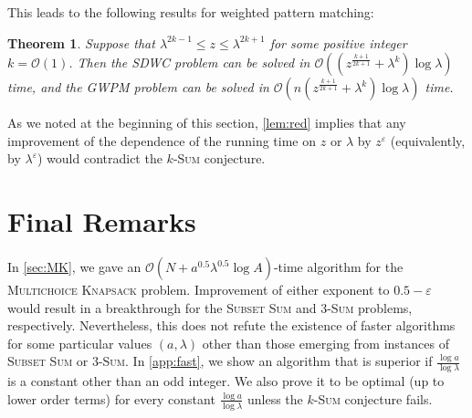 \documentclass{article}
\theoremstyle{plain}
\newtheorem{theorem}{Theorem}[section]
\theoremstyle{definition}
\newcommand{\MK}{\textsc{Multichoice Knapsack}\xspace}
\newcommand{\GWPM}{\textsc{GWPM}\xspace}
\newcommand{\SDWC}{\textsc{SDWC}\xspace}
\newcommand{\SubsetSum}{\textsc{Subset Sum}\xspace}
\newcommand{\Sum}{\textsc{Sum}\xspace}
\newcommand{\Oh}{\mathcal{O}}
\begin{document}
    This leads to the following results for weighted pattern matching:
    
   \begin{theorem}\label{thm:fast}
	Suppose that $\lambda^{2k-1}\le z \le \lambda^{2k+1}$ for some positive integer $k=\Oh(1)$.
	Then the \SDWC problem can be solved in $\Oh((z^{\frac{k+1}{2k+1}} + \lambda^{k})\log\lambda)$ time,
	and the \GWPM problem can be solved in $\Oh(n(z^{\frac{k+1}{2k+1}} + \lambda^{k})\log\lambda)$ time.
	\end{theorem}	
    
    As we noted at the beginning of this section, \cref{lem:red} implies that
    any improvement of the dependence of the running time on $z$ or $\lambda$ by $z^{\varepsilon}$ (equivalently, by $\lambda^{\varepsilon}$)
    would contradict the $k$-\Sum conjecture.
	

  \section{Final Remarks}\label{sec:fr}
  In \cref{sec:MK}, we gave an $\Oh(N+a^{0.5}\lambda^{0.5}\log A)$-time algorithm for the \MK problem.
  Improvement of either exponent to $0.5 - \varepsilon$ would result in a breakthrough for the \SubsetSum and 3-\Sum problems,
  respectively. 
  Nevertheless, this does not refute the existence of faster algorithms for some particular values $(a,\lambda)$
  other than those emerging from instances of \SubsetSum or 3-\Sum.
  In \cref{app:fast}, we show an algorithm that is superior if $\frac{\log a}{\log \lambda}$ is a constant other than an odd integer.
  We also prove it to be optimal (up to lower order terms) for every constant $\frac{\log a}{\log \lambda}$
  unless the $k$-\Sum conjecture fails.

  
  
\end{document}
